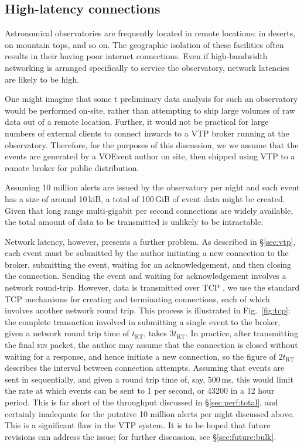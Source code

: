 \documentclass[5p,authoryear]{elsarticle}
\begin{document}
\subsection{High-latency connections}
\label{sec:perf:highlatency}

Astronomical observatories are frequently located in remote locations: in
deserts, on mountain tops, and so on. The geographic isolation of these
facilities often results in their having poor internet connections. Even if
high-bandwidth networking is arranged specifically to service the observatory,
network latencies are likely to be high.

One might imagine that some t preliminary data analysis for such an
observatory would be performed on-site, rather than attempting to ship large
volumes of raw data out of a remote location. Further, it would not be
practical for large numbers of external clients to connect inwards to a VTP
broker running at the observatory. Therefore, for the purposes of this
discussion, we we assume that the events are generated by a VOEvent author on
site, then shipped using VTP to a remote broker for public distribution.

Assuming 10 million alerts are issued by the observatory per night and each
event has a size of around 10\,kiB, a total of 100\,GiB of event data might be
created. Given that long range multi-gigabit per second connections are widely
available, the total amount of data to be transmitted is unlikely to be
intractable.

Network latency, however, presents a further problem. As described in
\S\ref{sec:vtp}, each event must be submitted by the author initiating a new
connection to the broker, submitting the event, waiting for an
acknowledgement, and then closing the connection. Sending the event and
waiting for acknowledgement involves a network round-trip.  However, data is
transmitted over TCP \citep{Cerf:1974}, we use the standard TCP mechanisms for
creating and terminating connections, each of which involves another network
round trip. This process is illustrated in Fig.~\ref{fig:tcp}: the complete
transaction involved in submitting a single event to the broker, given a
network round trip time of $t_\mathrm{RT}$, takes $3 t_\mathrm{RT}$. In
practice, after transmitting the final \textsc{fin} packet, the author may
assume that the connection is closed without waiting for a response, and hence
initiate a new connection, so the figure of $2 t_\mathrm{RT}$ describes the
interval between connection attempts.  Assuming that events are sent in
sequentially, and given a round trip time of, say, 500\,ms, this would limit
the rate at which events can be sent to 1 per second, or 43200 in a 12 hour
period. This is far short of the throughput discussed in
\S\ref{sec:perf:total}, and certainly inadequate for the putative 10 million
alerts per night discussed above. This is a significant flaw in the VTP
system. It is to be hoped that future revisions can address the issue; for
further discussion, see \S\ref{sec:future:bulk}.
\end{document}
